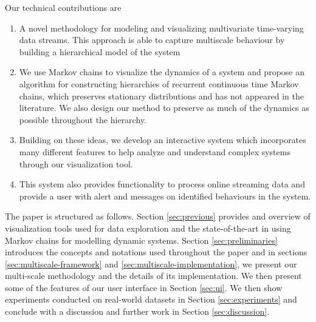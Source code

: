 Our technical contributions are
\begin{enumerate}{}
  \item A novel methodology for modeling and visualizing multivariate time-varying data streams. This approach is able to capture multiscale behaviour by building a hierarchical model of the system
  \item We use Markov chains to visualize the dynamics of a system and propose an algorithm for constructing hierarchies of recurrent continuous time Markov chains, which preserves stationary distributions and has not appeared in the literature. We also design our method to preserve as much of the dynamics as possible throughout the hierarchy.
  \item Building on these ideas, we develop an interactive system which incorporates many different features to help analyze and understand complex systems through our visualization tool.
  \item This system also provides functionality to process online streaming data and provide a user with  alert and messages on identified behaviours in the system.  
\end{enumerate}

The paper is structured as follows. Section \ref{sec:previous} provides and overview
of visualization tools used for data exploration and the state-of-the-art in using Markov chains for modelling dynamic systems.
Section \ref{sec:preliminaries} introduces the concepts and notations used throughout the paper and 
in sections \ref{sec:multiscale-framework} and \ref{sec:multiscale-implementation}, we present
our multi-scale methodology and the details of its implementation. We then present some of the 
features of our user interface in Section \ref{sec:ui}. We then show experiments conducted on real-world datasets in Section \ref{sec:experiments} and conclude with a discussion and further work in Section \ref{sec:discussion}.


